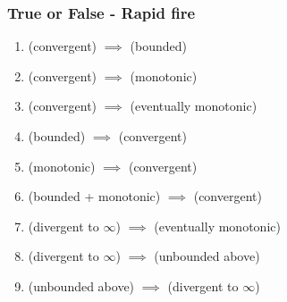 \documentclass[14pt]{beamer}
\begin{document}
	\begin{frame}[t]
		\frametitle{True or False - Rapid fire}

		\begin{enumerate}
			\item (convergent) $\displaystyle \implies$ (bounded)
				\vfill

			\item (convergent) $\displaystyle \implies$ (monotonic)
				\vfill

			\item (convergent) $\displaystyle \implies$ (eventually monotonic)
				\vfill

			\item (bounded) $\displaystyle \implies$ (convergent)
				\vfill

			\item (monotonic) $\displaystyle \implies$ (convergent)
				\vfill

			\item (bounded + monotonic) $\displaystyle \implies$ (convergent)
				\vfill

			\item (divergent to $\infty$) $\displaystyle \implies$ (eventually
				monotonic)
				\vfill

			\item (divergent to $\infty$) $\displaystyle \implies$ (unbounded above)
				\vfill

			\item (unbounded above) $\displaystyle \implies$ (divergent to $\infty$)
		\end{enumerate}
		\vfill

		\vfill
	\end{frame}
\end{document}
